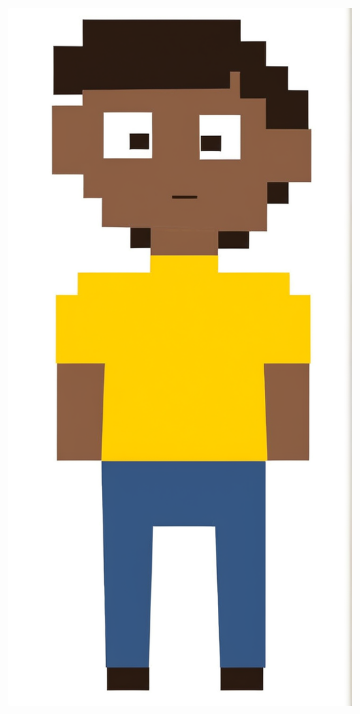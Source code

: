\begin{figure}[htbp]
    \centering
    \caption{\small Resultado do modelo Juggernaut XL com prompt guidance em 8}
    \label{fig:cgDreamJugger8}
    \begin{subfigure}{0.15\linewidth}
        \includegraphics[width=1\linewidth]{figs/cgDream/res_img_jug8a.png}

\end{subfigure}
\end{figure}
